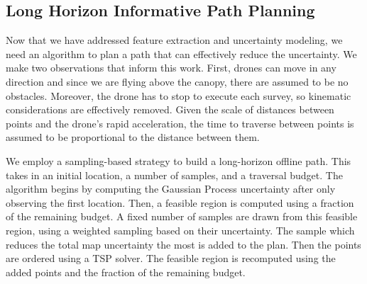 \subsection{Long Horizon Informative Path Planning}
Now that we have addressed feature extraction and uncertainty modeling, we need an algorithm to plan a path that can effectively reduce the uncertainty. We make two observations that inform this work. First, drones can move in any direction and since we are flying above the canopy, there are assumed to be no obstacles. Moreover, the drone has to stop to execute each survey, so kinematic considerations are effectively removed. Given the scale of distances between points and the drone's rapid acceleration, the time to traverse between points is assumed to be proportional to the distance between them.  



We employ a sampling-based strategy to build a long-horizon offline path. This takes in an initial location, a number of samples, and a traversal budget. The algorithm begins by computing the Gaussian Process uncertainty after only observing the first location. Then, a feasible region is computed using a fraction of the remaining budget. A fixed number of samples are drawn from this feasible region, using a weighted sampling based on their uncertainty. The sample which reduces the total map uncertainty the most is added to the plan. Then the points are ordered using a TSP solver. The feasible region is recomputed using the added points and the fraction of the remaining budget.

